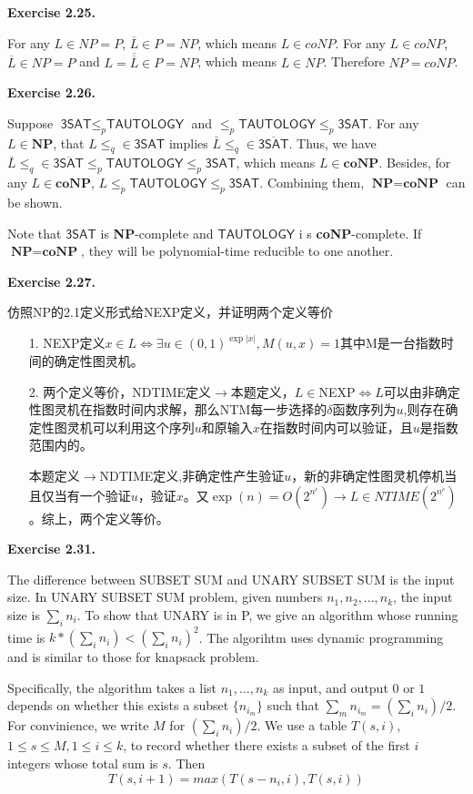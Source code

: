 \documentclass[a4paper]{article}
\newenvironment{exercise}[1]{
	\par
	\noindent\textbf{Exercise #1.}\quad
}{
	\par
	\bigskip
}
\begin{document}
    \begin{exercise}{2.25}
        For any $L\in NP=P$, $\overline{L}\in P=NP$, which means $L\in coNP$.
        For any $L\in coNP$, $\overline{L}\in NP=P$ and $L=\overline{\overline{L}}\in P=NP$, which means $L\in NP$.
        Therefore $NP=coNP$.
    \end{exercise}
	
	\begin{exercise}{2.26}
		Suppose $\textsf{3SAT} \leq_p \textsf{TAUTOLOGY}$ and $ \leq_p \textsf{TAUTOLOGY} \leq_p \textsf{3SAT}$. For any $L \in \textbf{NP}$, that $L \leq_q \in \textsf{3SAT}$ implies $\bar L \leq_q \in \overline{\textsf{3SAT}}$. Thus, we have $\bar L \leq_q \in \overline{\textsf{3SAT}} \leq_p \textsf{TAUTOLOGY} \leq_p \textsf{3SAT}$, which means $L \in \textbf{coNP}$. Besides, for any $L \in \textbf{coNP}$, $L \leq_p \textsf{TAUTOLOGY} \leq_p \textsf{3SAT}$. Combining them, $\textbf{NP} = \textbf{coNP}$ can be shown.

		Note that $\textsf{3SAT}$ is \textbf{NP}-complete and $\textsf{TAUTOLOGY}$ i s \textbf{coNP}-complete. If $\textbf{NP} = \textbf{coNP}$, they will be polynomial-time reducible to one another.
	\end{exercise}

	\begin{exercise}{2.27}
		仿照NP的2.1定义形式给NEXP定义，并证明两个定义等价
		\begin{itemize}
			\item [1.] NEXP定义$x\in L \iff\exists u\in (0,1)^{\exp|x|},M(u,x)=1$其中M是一台指数时间的确定性图灵机。
			\item [2.] 两个定义等价，NDTIME定义$\to$本题定义，$L\in $NEXP$\iff L$可以由非确定性图灵机在指数时间内求解，那么NTM每一步选择的$\delta$函数序列为$u$,则存在确定性图灵机可以利用这个序列$u$和原输入$x$在指数时间内可以验证，且$u$是指数范围内的。

				本题定义$\to$NDTIME定义,非确定性产生验证$u$，新的非确定性图灵机停机当且仅当有一个验证$u$，验证$x$。又$\exp(n) =O(2^{n^c})\to L\in NTIME(2^{n^c})$。综上，两个定义等价。
		\end{itemize}
	\end{exercise}

\begin{exercise}{2.31}
The difference between SUBSET SUM and UNARY SUBSET SUM is the input size. In UNARY SUBSET SUM problem, given numbers $n_1,n_2,...,n_k$, the input size is $\sum_i n_i$. To show that UNARY is in P, we give an algorithm whose running time is $k*(\sum_i n_i)<(\sum_i n_i)^2$. The algorihtm uses dynamic programming and is
similar to those for knapsack problem.

Specifically, the algorithm takes a list $n_1,...,n_k$ as input, and output $0$ or $1$ depends on whether this exists a subset $\{n_{i_{m}}\}$ such that $\sum_m n_{i_m}=(\sum_i n_i)/2$. For convinience, we write $M$ for $(\sum_i n_i)/2$. We use a table $T(s,i)$, $1\leq s\leq M, 1\leq i\leq k$, to record whether there exists a subset of the first $i$ integers whose total sum is $s$. Then
$$
T(s,i+1)=max(T(s-n_i,i), T(s,i))
$$
\end{exercise}
\end{document}
